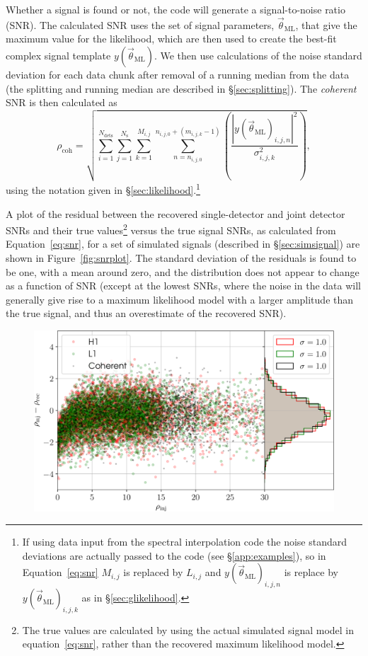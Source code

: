Whether a signal is found or not, the code will generate a signal-to-noise ratio (SNR). The calculated SNR uses the set of signal
parameters, $\vec{\theta}_{\text{ML}}$, that give the maximum value for the likelihood, which are then used to create the best-fit
complex signal template $y(\vec{\theta}_{\text{ML}})$. We then use calculations of the
noise standard deviation for each data chunk after removal of a running median from the data (the splitting and running median are
described in \S\ref{sec:splitting}). The {\it coherent} SNR is then calculated as
\begin{equation}\label{eq:snr}
 \rho_{\text{coh}} = \sqrt{\sum_{i=1}^{N_{\text{dets}}} \sum_{j=1}^{N_{\text{s}}}
\sum_{k=1}^{M_{i,j}} \sum_{n=n_{i,j,0}}^{n_{i,j,0}+(m_{i,j,k}-1)}\left(\frac{|y(\vec{\theta}_{\text{ML}})_{i,j,n}|^2}{\sigma_{i,j,k}^2}\right)},
\end{equation}
using the notation given in \S\ref{sec:likelihood}.\footnote{If using data input from the spectral interpolation code \citep{2017CQGra..34a5010D}
the noise standard deviations are actually passed to the code (see \S\ref{app:examples}), so in Equation~\ref{eq:snr} $M_{i,j}$ is replaced
by $L_{i,j}$ and $y(\vec{\theta}_{\text{ML}})_{i,j,n}$ is replace by $y(\vec{\theta}_{\text{ML}})_{i,j,k}$ as in \S\ref{sec:glikelihood}.}

A plot of the residual between the recovered single-detector and joint detector SNRs and their true values\footnote{The true values are calculated
by using the actual simulated signal model in equation~\ref{eq:snr}, rather than the recovered maximum likelihood model.} versus the true signal SNRs,
as calculated from Equation~\ref{eq:snr}, for a set of simulated signals (described in \S\ref{sec:simsignal}) are shown in Figure~\ref{fig:snrplot}.
The standard deviation of the residuals is found to be one, with a mean around zero, and the distribution does not appear to change as a function of SNR (except at the
lowest SNRs, where the noise in the data will generally give rise to a maximum likelihood model with a larger amplitude than the true signal, and thus
an overestimate of the recovered SNR).

\begin{figure}[!phtb]
\begin{center}
\includegraphics[width=1\columnwidth]{./figures/codeeval/stats/snrs/snr_plot}
\caption{ \protect}
\end{center}
\end{figure}

